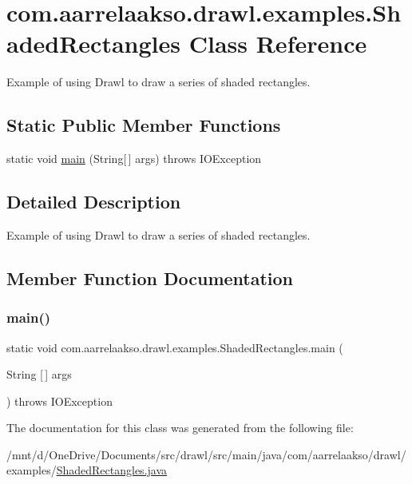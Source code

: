 \hypertarget{classcom_1_1aarrelaakso_1_1drawl_1_1examples_1_1_shaded_rectangles}{}\section{com.\+aarrelaakso.\+drawl.\+examples.\+Shaded\+Rectangles Class Reference}
\label{classcom_1_1aarrelaakso_1_1drawl_1_1examples_1_1_shaded_rectangles}


Example of using Drawl to draw a series of shaded rectangles.  


\subsection*{Static Public Member Functions}
\begin{DoxyCompactItemize}
\item 
static void \hyperlink{classcom_1_1aarrelaakso_1_1drawl_1_1examples_1_1_shaded_rectangles_a08e036088dc3ac523392c9e86ecef089}{main} (String\mbox{[}$\,$\mbox{]} args)  throws I\+O\+Exception     
\end{DoxyCompactItemize}


\subsection{Detailed Description}
Example of using Drawl to draw a series of shaded rectangles. 

\subsection{Member Function Documentation}
\mbox{\label{classcom_1_1aarrelaakso_1_1drawl_1_1examples_1_1_shaded_rectangles_a08e036088dc3ac523392c9e86ecef089}} 
\subsubsection{\texorpdfstring{main()}{main()}}
{\footnotesize\ttfamily static void com.\+aarrelaakso.\+drawl.\+examples.\+Shaded\+Rectangles.\+main (\begin{DoxyParamCaption}\item[{String \mbox{[}$\,$\mbox{]}}]{args }\end{DoxyParamCaption}) throws I\+O\+Exception\hspace{0.3cm}{\ttfamily [static]}}



The documentation for this class was generated from the following file\+:\begin{DoxyCompactItemize}
\item 
/mnt/d/\+One\+Drive/\+Documents/src/drawl/src/main/java/com/aarrelaakso/drawl/examples/\hyperlink{_shaded_rectangles_8java}{Shaded\+Rectangles.\+java}\end{DoxyCompactItemize}
